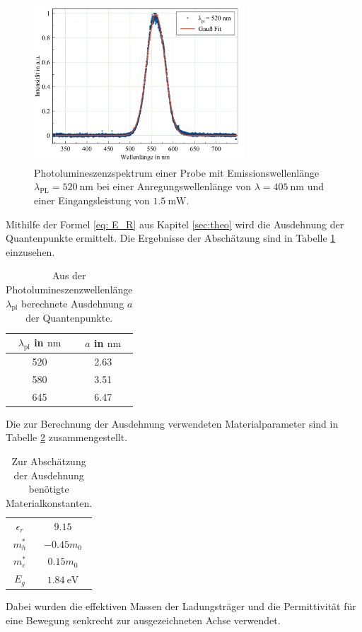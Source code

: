\begin{figure}[H]
  \centering
  \includegraphics[width=0.7\textwidth]{plots/PL_520nm.png}
  \caption{Photolumineszenzspektrum einer Probe mit Emissionswellenlänge $\lambda_{\text{PL}}=\SI{520}{\nano\meter}$ bei einer Anregungswellenlänge von $\lambda=\SI{405}{\nano\meter}$ und einer Eingangsleistung von $\SI{1,5}{\milli\watt}$.}
  \label{fig:pl520}
\end{figure}

Mithilfe der Formel \ref{eq: E_R} aus Kapitel \ref{sec:theo} wird die Ausdehnung der Quantenpunkte ermittelt. Die Ergebnisse der Abschätzung sind in Tabelle \ref{tab:breiten} einzusehen.
\begin{table}[H]
  \centering
  \caption{Aus der Photolumineszenzwellenlänge $\lambda_{\text{pl}}$ berechnete Ausdehnung $a$ der Quantenpunkte.}
  \label{tab:breiten}
  \begin{tabular}{cc}
    \toprule
     $\lambda_{\text{pl}}$ in $\si{\nano\meter}$& $a$ in $\si{\nano\meter}$ \\
    \midrule
    520 & 2.63 \\
    580 & 3.51 \\
    645 & 6.47 \\
    \bottomrule
  \end{tabular}
\end{table}

Die zur Berechnung der Ausdehnung verwendeten Materialparameter sind in Tabelle \ref{tab:const} zusammengestellt.
\begin{table}[H]
  \centering
  \caption{Zur Abschätzung der Ausdehnung benötigte Materialkonstanten. \cite{dissArens}}
  \label{tab:const}
  \begin{tabular}{c|c}
    \toprule
    $\epsilon_r $ & $ 9.15$ \\
    $m^*_h$ & $ -0.45 m_0$ \\
    $m^*_e $ & $ 0.15 m_0$ \\
    $E_g $ & $\SI{1.84}{\electronvolt}$ \\
    \bottomrule
  \end{tabular}
\end{table}
Dabei wurden die effektiven Massen der Ladungsträger und die Permittivität für eine Bewegung senkrecht zur ausgezeichneten Achse verwendet.

